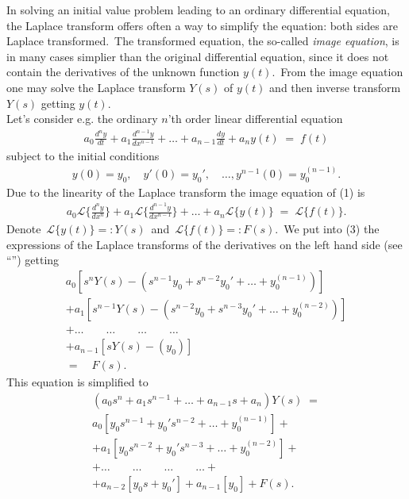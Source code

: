 \documentclass[12pt]{article}
\begin{document}
In solving an initial value problem leading to an ordinary differential 
equation, the Laplace transform offers often a way to simplify the equation:  
both sides are Laplace transformed.\, The transformed equation, the so-called 
{\it image equation}, is in many cases simplier than the original differential 
equation, since it does not contain the derivatives of the unknown function 
$y(t)$.\, From the image equation one may solve the Laplace transform $Y(s)$ of 
$y(t)$ and then inverse transform $Y(s)$ getting $y(t)$.\\

Let's consider e.g. the ordinary $n$'th order linear 
differential equation
\begin{align}
 a_0\frac{d^ny}{dt}+a_1\frac{d^{n-1}y}{dx^{n-1}}+\ldots
 +a_{n-1}\frac{dy}{dt}+a_ny(t) \;=\; f(t)
\end{align}
subject to the initial conditions
\begin{align}
y(0)=y_0,\quad y'(0)=y_0',\quad\ldots, y^{n-1}(0)=y_0^{(n-1)}.
\end{align}
Due to the linearity of the Laplace transform the image equation 
of (1) is
\begin{align}
 a_0\mathcal{L}\{\frac{d^ny}{dx^n}\}
 +a_1\mathcal{L}\{\frac{d^{n-1}y}{dx^{n-1}}\}+\ldots
 +a_n\mathcal{L}\{y(t)\} \;=\; \mathcal{L}\{f(t)\}.
\end{align}
Denote\, $\mathcal{L}\{y(t)\} =: Y(s)$\, and\, 
$\mathcal{L}\{f(t)\} =: F(s)$.\, We put into (3) the expressions
of the Laplace transforms of the derivatives on the left hand side (see ``'') 
getting
\begin{align*}
 a_0[s^nY(s)-(s^{n-1}y_0+s^{n-2}y_0'+\ldots+y_0^{(n-1)})]\\
 +a_1[s^{n-1}Y(s)-(s^{n-2}y_0+s^{n-3}y_0'+\ldots+y_0^{(n-2)})]\\
 +\ldots\qquad\ldots\qquad\ldots\qquad\ldots\\
 +a_{n-1}[sY(s)-(y_0)]\\
 = \quad F(s).
\end{align*}
This equation is simplified to
\begin{align*}
 (a_0s^n+a_1s^{n-1}+\ldots+a_{n-1}s+a_n)Y(s) \;=\\
 a_0[y_0s^{n-1}+y_0's^{n-2}+\ldots+y_0^{(n-1)}]+\\
 +a_1[y_0s^{n-2}+y_0's^{n-3}+\ldots+y_0^{(n-2)}]+\\
 +\ldots\qquad\ldots\qquad\ldots\qquad\ldots+\\
 +a_{n-2}[y_0s+y_0']+a_{n-1}[y_0]+F(s).\\
 \end{align*}
\end{document}

